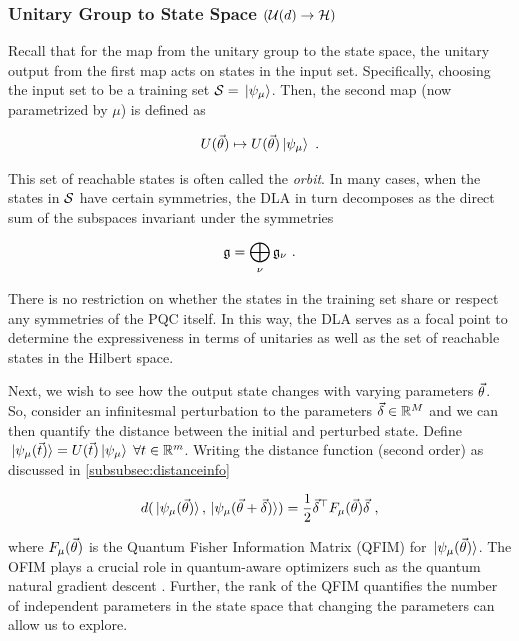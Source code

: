 \subsubsection{Unitary Group to State Space \((\mathcal{U}(d) \to
\mathcal{H})\)} 

Recall that for the map from the unitary group to the state space, the unitary
output from the first map acts on states in the input set. Specifically,
choosing the input set to be a training set \(\mathcal{S} = \ket*{\psi_\mu}\).
Then, the second map (now parametrized by \(\mu\)) is defined as

\begin{equation}
    U(\vec{\theta}) \mapsto U(\vec{\theta})\ket*{\psi_\mu}~.
\end{equation}

This set of reachable states is often called the \emph{orbit}. In many cases,
when the states in \(\mathcal{S}\) have certain symmetries, the DLA in turn
decomposes as the direct sum of the subspaces invariant under the symmetries

\begin{equation}
    \mathfrak{g} = \bigoplus_\nu \mathfrak{g}_\nu~.
\end{equation}

There is no restriction on whether the states in the training set share or
respect any symmetries of the PQC itself. In this way, the DLA serves as a focal
point to determine the expressiveness in terms of unitaries as well as the set
of reachable states in the Hilbert space.

Next, we wish to see how the output state changes with varying parameters
\(\vec{\theta}\). So, consider an infinitesmal perturbation to the parameters
\(\vec{\delta} \in \mathbb{R}^M\) and we can then quantify the distance between the
initial and perturbed state. Define \(\ket*{\psi_\mu(\vec{t})} =
U(\vec{t})\ket*{\psi_\mu}\;\forall t \in \mathbb{R}^m\). Writing the distance
function (second order) as discussed in \autoref{subsubsec:distanceinfo}

\begin{equation}
    d(\ket*{\psi_\mu (\vec{\theta})}, \ket*{\psi_\mu(\vec{\theta} + \vec{\delta})}) 
        = \frac{1}{2} \vec{\delta}^\top F_\mu(\vec{\theta}) \vec{\delta}~,
\end{equation}

where \(F_\mu(\vec{\theta})\) is the Quantum Fisher Information Matrix (QFIM) for
\(\ket*{\psi_\mu(\vec{\theta})}\). The OFIM plays a crucial role in quantum-aware
optimizers such as the quantum natural gradient descent
\cite{stokes2020quantum,koczor2019quantum,gacon2021simultaneous,haug2021natural}.
Further, the rank of the QFIM quantifies the number of independent parameters in
the state space that changing the parameters can allow us to explore.

